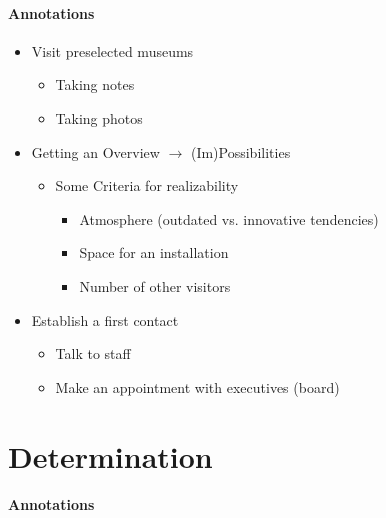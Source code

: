 \paragraph{Annotations}

\begin{itemize}
	\item Visit preselected museums
	\begin{itemize}
		\item Taking notes
		\item Taking photos
	\end{itemize}
	\item Getting an Overview $\to$ (Im)Possibilities
	\begin{itemize}
		\item Some Criteria for realizability
		\begin{itemize}
			\item Atmosphere (outdated vs. innovative tendencies)
			\item Space for an installation
			\item Number of other visitors
		\end{itemize}
	\end{itemize}
	\item Establish a first contact
	\begin{itemize}
		\item Talk to staff
		\item Make an appointment with executives (board)
	\end{itemize}
\end{itemize}


\section{Determination}
\label{museums_determination}

\paragraph{Annotations}


